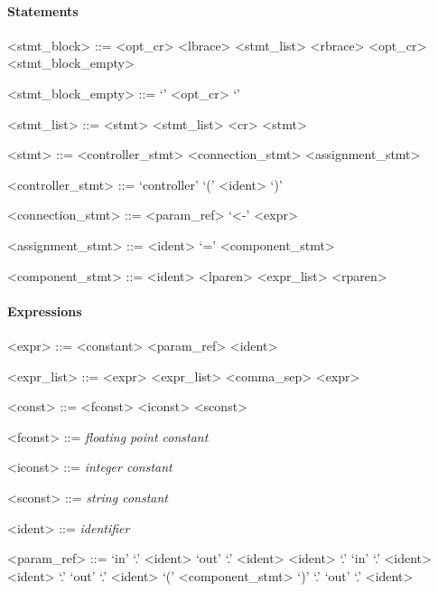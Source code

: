 \paragraph{Statements}

\begin{grammar}
  <stmt_block> ::= <opt_cr> <lbrace> <stmt_list> <rbrace>
  \alt <opt_cr> <stmt_block_empty>

  <stmt_block_empty> ::= `{' <opt_cr> `}'

  <stmt_list> ::= <stmt>
  \alt <stmt_list> <cr> <stmt>

  <stmt> ::= <controller_stmt>
  \alt <connection_stmt>
  \alt <assignment_stmt>

  <controller_stmt> ::= `controller' `(' <ident> `)'

  <connection_stmt> ::= <param_ref> `\textless-' <expr>

  <assignment_stmt> ::= <ident> `=' <component_stmt>

  <component_stmt> ::= <ident> <lparen> <expr_list> <rparen>
\end{grammar}


\paragraph{Expressions}

\begin{grammar}
  <expr> ::= <constant>
  \alt <param_ref>
  \alt <ident>

  <expr_list> ::= <expr>
  \alt <expr_list> <comma_sep> <expr>

  <const> ::= <fconst>
  \alt <iconst>
  \alt <sconst>

  <fconst> ::= \emph{floating point constant}

  <iconst> ::= \emph{integer constant}

  <sconst> ::= \emph{string constant}

  <ident> ::= \emph{identifier}

  <param_ref> ::= `in' `.' <ident>
  \alt `out' `.' <ident>
  \alt <ident> `.' `in' `.' <ident>
  \alt <ident> `.' `out' `.' <ident>
  \alt `(' <component_stmt> `)' `.' `out' `.' <ident>
\end{grammar}


